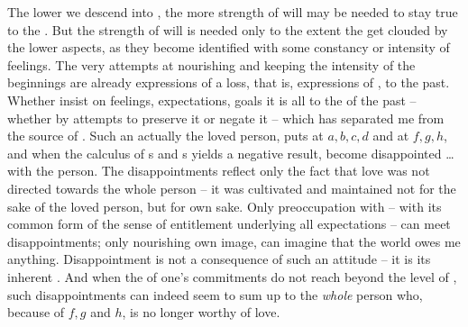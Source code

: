 The lower we descend into , the more strength of will may be
needed to stay true to the .  But the strength of will is
needed only to the extent the  get clouded by the
lower aspects, as they become identified with some constancy or intensity of
feelings.
The very attempts at nourishing and keeping the intensity of the beginnings are
already expressions of a loss, that is, expressions of ,
 to the past. Whether  insist on  feelings, 
expectations,  goals it is all  to the  of
the past -- whether by attempts to preserve it or negate it -- which has
separated me from the  source of .  Such an
 actually  the loved person, puts \thi{+} at
$a,b,c,d$ and \thi{--} at $f,g,h$, and when the calculus of \thi{+}s and
\thi{--}s yields a negative result,  become disappointed \ldots with the
person. The disappointments reflect only the fact that  love was not
directed towards the whole person -- it was cultivated and maintained not for
the sake of the loved person, but for  own sake. Only preoccupation with  -- with its common
form of the sense of entitlement underlying all expectations -- can meet
disappointments; only nourishing  own image, can  imagine that the
world owes me anything. Disappointment is not a consequence of such an attitude
-- it is its inherent . And when the  of one's commitments
do not reach beyond the level of , such disappointments can indeed
seem to sum up to the {\em whole} person who, because of $f,g$ and $h$, is no
longer worthy of  love.

